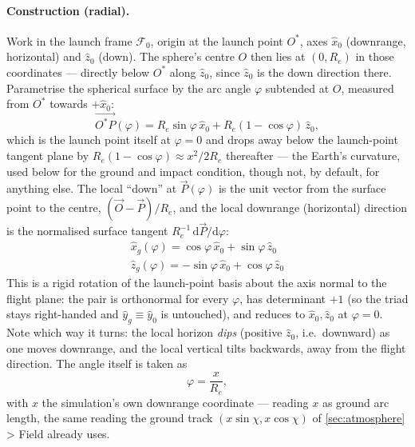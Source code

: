 \paragraph{Construction (radial).} Work in the launch frame $\mathcal{F}_0$, origin at the launch
point $O^*$, axes $\hat{x}_0$ (downrange, horizontal) and $\hat{z}_0$ (down). The sphere's centre
$O$ then lies at $(0,R_e)$ in those coordinates --- directly below $O^*$ along $\hat{z}_0$, since
$\hat{z}_0$ is the down direction there. Parametrise the spherical surface by the arc angle
$\varphi$ subtended at $O$, measured from $O^*$ towards $+\hat{x}_0$:
\begin{equation} \label{eq:surface_point}
    \vec{O^*P}(\varphi) = R_e\sin\varphi\,\hat{x}_0 + R_e(1-\cos\varphi)\,\hat{z}_0,
\end{equation}
which is the launch point itself at $\varphi=0$ and drops away below the launch-point tangent
plane by $R_e(1-\cos\varphi)\approx x^2/2R_e$ thereafter --- the Earth's curvature, used below for
the ground and impact condition, though not, by default, for anything else. The local ``down'' at
$\vec{P}(\varphi)$ is the unit vector from the surface point to the centre, $(\vec{O}-\vec{P})/R_e$,
and the local downrange (horizontal) direction is the normalised surface tangent
$R_e^{-1}\,\mathrm{d}\vec{P}/\mathrm{d}\varphi$:
\begin{gather}
    \hat{x}_g(\varphi) = \cos\varphi\,\hat{x}_0 + \sin\varphi\,\hat{z}_0
        \label{eq:xhat_g_rotated} \\
    \hat{z}_g(\varphi) = -\sin\varphi\,\hat{x}_0 + \cos\varphi\,\hat{z}_0
        \label{eq:zhat_g_rotated}
\end{gather}
This is a rigid rotation of the launch-point basis about the axis normal to the flight plane: the
pair is orthonormal for every $\varphi$, has determinant $+1$ (so the triad stays right-handed and
$\hat{y}_g\equiv\hat{y}_0$ is untouched), and reduces to $\hat{x}_0,\hat{z}_0$ at $\varphi=0$. Note
which way it turns: the local horizon \emph{dips} (positive $\hat{z}_0$, i.e.\ downward) as one
moves downrange, and the local vertical tilts backwards, away from the flight direction. The angle
itself is taken as
\begin{equation} \label{eq:phi_downrange}
    \varphi = \frac{x}{R_e},
\end{equation}
with $x$ the simulation's own downrange coordinate --- reading $x$ as ground arc length, the same
reading the ground track $(x\sin\chi, x\cos\chi)$ of \autoref{sec:atmosphere} > Field already uses.


